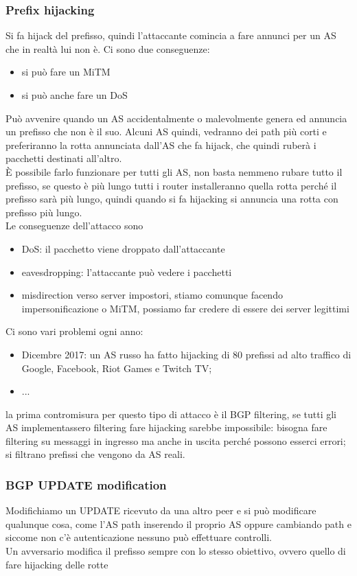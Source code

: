 \documentclass[12pt, oneside]{extbook} %
\begin{document}
\subsubsection{Prefix hijacking}
Si fa hijack del prefisso, quindi l'attaccante comincia a fare annunci per un AS che in realtà lui non è. Ci sono due conseguenze:
\begin{itemize}
\item si può fare un MiTM
\item si può anche fare un DoS
\end{itemize}
Può avvenire quando un AS accidentalmente o malevolmente genera ed annuncia un prefisso che non è il suo. Alcuni AS quindi, vedranno dei path più corti e preferiranno la rotta annunciata dall'AS che fa hijack, che quindi ruberà i pacchetti destinati all'altro.\\È possibile farlo funzionare per tutti gli AS, non basta nemmeno rubare tutto il prefisso, se questo è più lungo tutti i router installeranno quella rotta perché il prefisso sarà più lungo, quindi quando si fa hijacking si annuncia una rotta con prefisso più lungo.\\Le conseguenze dell'attacco sono
\begin{itemize}
\item DoS: il pacchetto viene droppato dall'attaccante
\item eavesdropping: l'attaccante può vedere i pacchetti
\item misdirection verso server impostori, stiamo comunque facendo impersonificazione o MiTM, possiamo far credere di essere dei server legittimi
\end{itemize}
Ci sono vari problemi ogni anno:
\begin{itemize}
\item Dicembre 2017: un AS russo ha fatto hijacking di 80 prefissi ad alto traffico di Google, Facebook, Riot Games e Twitch TV;
\item ...
\end{itemize}
la prima contromisura per questo tipo di attacco è il BGP filtering, se tutti gli AS implementassero filtering fare hijacking sarebbe impossibile: bisogna fare filtering su messaggi in ingresso ma anche in uscita perché possono esserci errori; si filtrano prefissi che vengono da AS reali.
\subsubsection{BGP UPDATE modification}
Modifichiamo un UPDATE ricevuto da una altro peer e si può modificare qualunque cosa, come l'AS path inserendo il proprio AS oppure cambiando path e siccome non c'è autenticazione nessuno può effettuare controlli.\\Un avversario modifica il prefisso sempre con lo stesso obiettivo, ovvero quello di fare hijacking delle rotte
\end{document}

